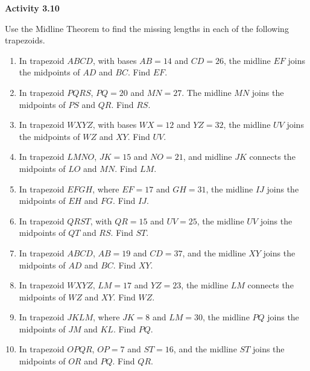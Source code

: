 \vspace{0.3ex}
\noindent\textbf{Activity 3.10}

\vspace{0.2ex}

Use the Midline Theorem to find the missing lengths in each of the following trapezoids.
\begin{enumerate}[label=\color{blue}\arabic*.]
    \item In trapezoid \(ABCD\), with bases \(AB = 14\) and \(CD = 26\), the midline \(EF\) joins the midpoints of \(AD\) and \(BC\). Find \(EF\).
    \item In trapezoid \(PQRS\), \(PQ = 20\) and \(MN = 27\). The midline \(MN\) joins the midpoints of \(PS\) and \(QR\). Find \(RS\).
    \item In trapezoid \(WXYZ\), with bases \(WX = 12\) and \(YZ = 32\), the midline \(UV\) joins the midpoints of \(WZ\) and \(XY\). Find \(UV\).
    \item In trapezoid \(LMNO\), \(JK = 15\) and \(NO = 21\), and midline \(JK\) connects the midpoints of \(LO\) and \(MN\). Find \(LM\).
    \item In trapezoid \(EFGH\), where \(EF = 17\) and \(GH = 31\), the midline \(IJ\) joins the midpoints of \(EH\) and \(FG\). Find \(IJ\).
    \item In trapezoid \(QRST\), with \(QR = 15\) and \(UV = 25\), the midline \(UV\) joins the midpoints of \(QT\) and \(RS\). Find \(ST\).
    \item In trapezoid \(ABCD\), \(AB = 19\) and \(CD = 37\), and the midline \(XY\) joins the midpoints of \(AD\) and \(BC\). Find \(XY\).
    \item In trapezoid \(WXYZ\), \(LM = 17\) and \(YZ = 23\), the midline \(LM\) connects the midpoints of \(WZ\) and \(XY\). Find \(WZ\).
    \item In trapezoid \(JKLM\), where \(JK = 8\) and \(LM = 30\), the midline \(PQ\) joins the midpoints of \(JM\) and \(KL\). Find \(PQ\).
    \item In trapezoid \(OPQR\), \(OP = 7\) and \(ST = 16\), and the midline \(ST\) joins the midpoints of \(OR\) and \(PQ\). Find \(QR\).
\end{enumerate}
